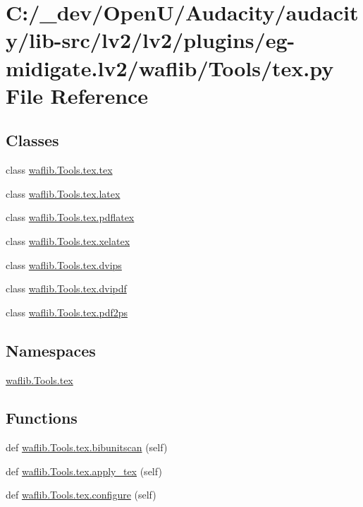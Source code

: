\hypertarget{lv2_2plugins_2eg-midigate_8lv2_2waflib_2_tools_2tex_8py}{}\section{C\+:/\+\_\+dev/\+Open\+U/\+Audacity/audacity/lib-\/src/lv2/lv2/plugins/eg-\/midigate.lv2/waflib/\+Tools/tex.py File Reference}
\label{lv2_2plugins_2eg-midigate_8lv2_2waflib_2_tools_2tex_8py}
\subsection*{Classes}
\begin{DoxyCompactItemize}
\item 
class \hyperlink{classwaflib_1_1_tools_1_1tex_1_1tex}{waflib.\+Tools.\+tex.\+tex}
\item 
class \hyperlink{classwaflib_1_1_tools_1_1tex_1_1latex}{waflib.\+Tools.\+tex.\+latex}
\item 
class \hyperlink{classwaflib_1_1_tools_1_1tex_1_1pdflatex}{waflib.\+Tools.\+tex.\+pdflatex}
\item 
class \hyperlink{classwaflib_1_1_tools_1_1tex_1_1xelatex}{waflib.\+Tools.\+tex.\+xelatex}
\item 
class \hyperlink{classwaflib_1_1_tools_1_1tex_1_1dvips}{waflib.\+Tools.\+tex.\+dvips}
\item 
class \hyperlink{classwaflib_1_1_tools_1_1tex_1_1dvipdf}{waflib.\+Tools.\+tex.\+dvipdf}
\item 
class \hyperlink{classwaflib_1_1_tools_1_1tex_1_1pdf2ps}{waflib.\+Tools.\+tex.\+pdf2ps}
\end{DoxyCompactItemize}
\subsection*{Namespaces}
\begin{DoxyCompactItemize}
\item 
 \hyperlink{namespacewaflib_1_1_tools_1_1tex}{waflib.\+Tools.\+tex}
\end{DoxyCompactItemize}
\subsection*{Functions}
\begin{DoxyCompactItemize}
\item 
def \hyperlink{namespacewaflib_1_1_tools_1_1tex_a0995543408e2b3f7705b148ffcce08b3}{waflib.\+Tools.\+tex.\+bibunitscan} (self)
\item 
def \hyperlink{namespacewaflib_1_1_tools_1_1tex_ac13f6c937ac7ea4af8d30e2a71f312f0}{waflib.\+Tools.\+tex.\+apply\+\_\+tex} (self)
\item 
def \hyperlink{namespacewaflib_1_1_tools_1_1tex_a63e6ed812ce192be695521518632025a}{waflib.\+Tools.\+tex.\+configure} (self)
\end{DoxyCompactItemize}
